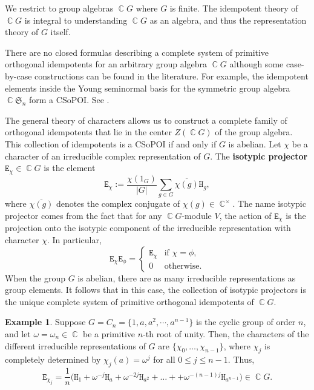 \documentclass[11pt, oneside, reqno]{amsart}
\theoremstyle{definition}
\newtheorem{example}[theorem]{Example}
\numberwithin{equation}{section}
\DeclareMathOperator{\C}{\mathbb{C}}
\newcommand{\defn}[1]{{\color{RoyalBlue}\bf#1}}
\def \kk{\C}
\def \ol{\overline}
\newcommand{\B}[1]{\mathtt{#1}} 			%
\begin{document}
We restrict to group algebras $\kk G$ where $G$ is finite. The idempotent theory of $\kk G$ is integral to understanding $\kk G$ as an algebra, and thus the representation theory of $G$ itself.

There are no closed formulas describing a complete system of primitive orthogonal idempotents for an arbitrary group algebra $\kk G$
although some case-by-case constructions can be found in the literature.
For example, the idempotent elements inside the Young seminormal basis for the symmetric group algebra $\kk \mathfrak{S}_n$ form a CSoPOI.
See \cite[Theorem~1.5]{Murphy1983}.

The general theory of characters allows us to construct a complete family of orthogonal idempotents that lie in the center $Z(\kk G)$ of the group algebra.
This collection of idempotents is a CSoPOI if and only if $G$ is abelian.
Let $\chi$ be a character of an irreducible complex representation of $G$.
The \defn{isotypic projector} $\B{E}_\chi \in \kk G$ is the element
\[
    \B{E}_\chi := \frac{\chi(1_G)}{|G|} \sum_{g \in G} \ol{\chi(g)} \B{H}_g,
\]
where $\ol{\chi(g)}$ denotes the complex conjugate of $\chi(g) \in \C^{\times}$.
The name isotypic projector comes from the fact that for any $\C G$-module $V$, the action of $\B{E}_{\chi}$ is the projection onto the isotypic component of the irreducible representation with character $\chi$.
In particular,
\[
    \B{E}_\chi \B{E}_\phi = \begin{cases}
        \B{E}_\chi      & \text{if } \chi = \phi,\\
        0               & \text{otherwise.}
    \end{cases} 
\]
When the group $G$ is abelian, there are as many irreducible representations as group elements.
It follows that in this case, the collection of isotypic projectors is the unique complete system of primitive orthogonal idempotents of $\kk G$.

\begin{example}
    Suppose $G = C_n = \{ 1, a, a^2, \cdots, a^{n-1} \}$ is the cyclic group of order $n$, and let $\omega = \omega_n \in \C$ be a primitive $n$-th root of unity.
    Then, the characters of the different irreducible representations of $G$ are $\{ \chi_0,\dots, \chi_{n-1} \}$, where $\chi_j$ is completely determined by $\chi_j(a) = \omega^j$ for all $0 \leq j \leq n-1$.
    Thus,
    \[
        \B{E}_{\chi_j}
        = \frac{1}{n} \Big( \B{H}_1 + \omega^{-j} \B{H}_{a} + \omega^{-2j} \B{H}_{a^2} + \dots +  + \omega^{-(n-1)j} \B{H}_{a^{n-1}} \Big)
        \in  \C G .
    \]
\end{example}
\end{document}
